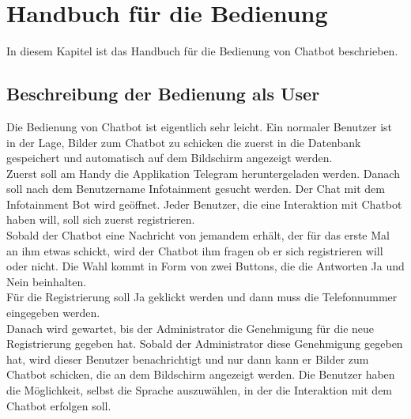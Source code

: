 \section{Handbuch für die Bedienung}
In diesem Kapitel ist das Handbuch für die Bedienung von Chatbot beschrieben.
\subsection{Beschreibung der Bedienung als User}
Die Bedienung von Chatbot ist eigentlich sehr leicht. Ein normaler Benutzer ist in der Lage, Bilder zum Chatbot zu schicken die zuerst in die Datenbank gespeichert und automatisch auf dem Bildschirm angezeigt werden. \\
Zuerst soll am Handy die Applikation Telegram heruntergeladen werden. Danach soll nach dem Benutzername Infotainment gesucht werden. Der Chat mit dem Infotainment Bot wird geöffnet. 
Jeder Benutzer, die eine Interaktion mit Chatbot haben will, soll sich zuerst registrieren. \\
Sobald der Chatbot eine Nachricht von jemandem erh\"alt, der für das erste Mal an ihm etwas schickt, wird der Chatbot ihm fragen ob er sich registrieren will oder nicht. Die Wahl kommt in Form von zwei Buttons, die die Antworten Ja und Nein beinhalten.\\
Für die Registrierung soll Ja geklickt werden und dann muss die Telefonnummer eingegeben werden. \\
Danach wird gewartet, bis der Administrator die Genehmigung für die neue Registrierung gegeben hat. Sobald der Administrator diese Genehmigung gegeben hat, wird dieser Benutzer benachrichtigt und nur dann kann er Bilder zum Chatbot schicken, die an dem Bildschirm angezeigt werden. Die Benutzer haben die M\"oglichkeit, selbst die Sprache auszuw\"ahlen, in der die Interaktion mit dem Chatbot erfolgen soll.
